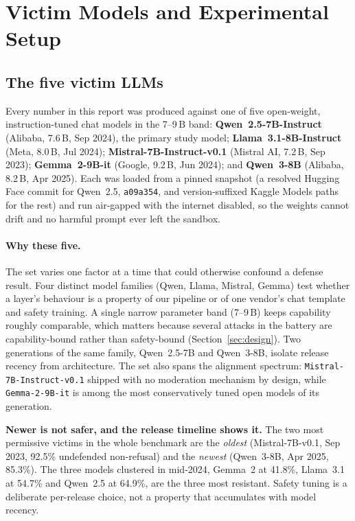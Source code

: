 \documentclass[11pt,a4paper]{article}
\begin{document}
\clearpage
\section{Victim Models and Experimental Setup}
\label{sec:setup}

\subsection{The five victim LLMs}

Every number in this report was produced against one of five open-weight,
instruction-tuned chat models in the 7--9\,B band: \textbf{Qwen~2.5-7B-Instruct} (Alibaba,
7.6\,B, Sep 2024), the primary study model; \textbf{Llama~3.1-8B-Instruct} (Meta, 8.0\,B,
Jul 2024); \textbf{Mistral-7B-Instruct-v0.1} (Mistral AI, 7.2\,B, Sep 2023);
\textbf{Gemma~2-9B-it} (Google, 9.2\,B, Jun 2024); and \textbf{Qwen~3-8B} (Alibaba,
8.2\,B, Apr 2025). Each was loaded from a pinned snapshot (a resolved Hugging Face
commit for Qwen~2.5, \texttt{a09a354}, and version-suffixed Kaggle Models paths for the
rest) and run air-gapped with the internet disabled, so the weights cannot drift and no
harmful prompt ever left the sandbox.

\paragraph{Why these five.} The set varies one factor at a time that could
otherwise confound a defense result. Four distinct model families (Qwen, Llama,
Mistral, Gemma) test whether a layer's behaviour is a property of our pipeline or of one
vendor's chat template and safety training. A single narrow parameter band
(7--9\,B) keeps capability roughly comparable, which matters because several attacks in
the battery are capability-bound rather than safety-bound (Section~\ref{sec:design}).
Two generations of the same family, Qwen~2.5-7B and Qwen~3-8B, isolate
release recency from architecture. The set also spans the alignment spectrum:
\texttt{Mistral-7B-Instruct-v0.1} shipped with no moderation mechanism by design, while
\texttt{Gemma-2-9B-it} is among the most conservatively tuned open models of its
generation.

\begin{findingbox}
\textbf{Newer is not safer, and the release timeline shows it.} The two most permissive
victims in the whole benchmark are the \emph{oldest} (Mistral-7B-v0.1, Sep 2023, 92.5\%
undefended non-refusal) and the \emph{newest} (Qwen~3-8B, Apr 2025, 85.3\%). The three
models clustered in mid-2024, Gemma~2 at 41.8\%, Llama~3.1 at 54.7\% and Qwen~2.5 at
64.9\%, are the three most resistant. Safety tuning is a deliberate per-release choice,
not a property that accumulates with model recency.
\end{findingbox}
\end{document}
